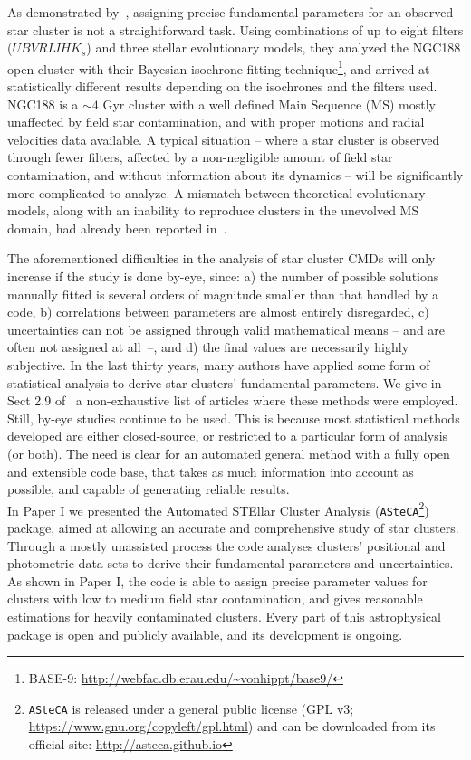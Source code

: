 \documentclass{aa}
\begin{document}
As demonstrated by~\cite{Hills_2015}, assigning precise fundamental
parameters for an observed star cluster is not a straightforward task.
Using combinations of up to eight filters ($UBVRIJHK_s$) and three stellar
evolutionary models, they analyzed the NGC188 open cluster with their
Bayesian isochrone fitting technique\footnote{BASE-9: 
\url{http://webfac.db.erau.edu/~vonhippt/base9/}}, and arrived at statistically
different results depending on the isochrones and the filters used.
%
NGC188 is a ${\sim}4$ Gyr cluster with a well defined Main Sequence (MS) mostly
unaffected by field star contamination, and with proper motions and radial
velocities data available.
A typical situation -- where a star cluster is observed through fewer
filters, affected by a non-negligible amount of field star contamination, and
without information about its dynamics -- will be significantly more
complicated to analyze.
%
A mismatch between theoretical evolutionary models, along with an
inability to reproduce clusters in the unevolved MS domain, had already
been reported in~\cite{Grocholski_2003}.

The aforementioned difficulties in the analysis of star cluster CMDs will only
increase if the study is done by-eye, since: a) the number of possible solutions
manually fitted is several orders of magnitude smaller than that handled by a
code, b) correlations between parameters are almost entirely disregarded, c)
uncertainties can not be assigned through valid mathematical
means -- and are often not assigned at \mbox{all --}, and d) the final values
are necessarily highly subjective.
%
In the last thirty years, many authors have applied some form of
statistical analysis to derive star clusters' fundamental parameters.
We give in Sect 2.9 of~\citet[][hereafter Paper I]{Perren_2015} a non-exhaustive
list of articles where these methods were employed.
%
Still, by-eye studies continue to be used. This is because most statistical
methods developed are either closed-source, or restricted to a particular form
of analysis (or both).
%
The need is clear for an automated general method with a fully open
and extensible code base, that takes as much information into account as
possible, and capable of generating reliable results.\\

In Paper I we presented the Automated STEllar
Cluster Analysis (\texttt{ASteCA}\footnote{\texttt{ASteCA} is released under a
general public license (GPL v3; \url{https://www.gnu.org/copyleft/gpl.html}) and
can be downloaded from its official site: \url{http://asteca.github.io}})
package, aimed at allowing an accurate and comprehensive study of star clusters.
%
Through a mostly unassisted process the code analyses clusters' positional
and photometric data sets to derive their fundamental parameters and
uncertainties.
As shown in Paper I, the code is able to assign precise parameter values for
clusters with low to medium field star contamination, and gives reasonable
estimations for heavily contaminated clusters. Every part of this astrophysical
package is open and publicly available, and its development is ongoing.
\end{document}
